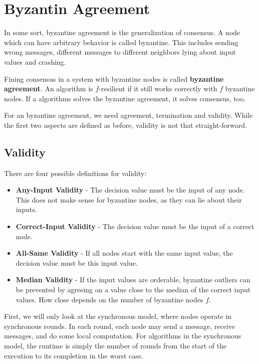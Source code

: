 \section{Byzantin Agreement}

In some sort, byzantine agreement is the generalization of consensus. A node which can have arbitrary behavior is called byzantine. This includes sending wrong messages, different messages to different neighbors lying about input values and crashing. \medskip

Fining consensus in a system with byzantine nodes is called \textbf{byzantine agreement}. An algorithm is $f$-resilient if it still works correctly with $f$ byzantine nodes. If a algorithms solves the byzantine agreement, it solves consensus, too. \medskip

For an byzantine agreement, we need agreement, termination and validity. While the first two aspects are defined as before, validity is not that straight-forward.


\subsection{Validity}

There are four possible definitions for validity:
\begin{itemize}
	\item \textbf{Any-Input Validity} - The decision value must be the input of any node. This does not make sense for byzantine nodes, as they can lie about their inputs.
	\item \textbf{Correct-Input Validity} - The decision value must be the input of a correct node.
	\item \textbf{All-Same Validity} - If all nodes start with the same input value, the decision value must be this input value.
	\item \textbf{Median Validity} - If the input values are orderable, byzantine outliers can be prevented by agreeing on a value close to the median of the correct input values. How close depends on the number of byzantine nodes $f$.
\end{itemize}

First, we will only look at the synchronous model, where nodes operate in synchronous rounds. In each round, each node may send a message, receive messages, and do some local computation. For algorithms in the synchronous model, the runtime is simply the number of rounds from the start of the execution to its completion in the worst case.


